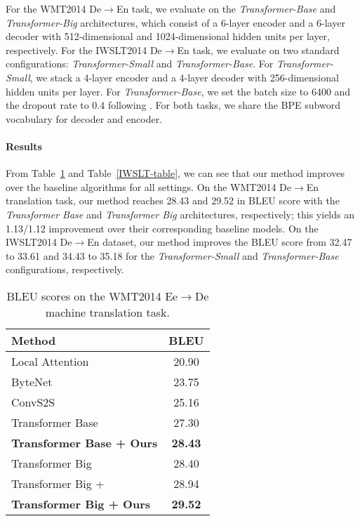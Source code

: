 \documentclass{article}
\begin{document}
For the WMT2014 De$\to$En task,
we evaluate on the \textit{Transformer-Base} and \textit{Transformer-Big} architectures,
which consist of a 6-layer encoder and a 6-layer decoder with 512-dimensional and 1024-dimensional hidden units per layer, respectively. 
For the IWSLT2014 De$\to$En task, 
we evaluate on two standard configurations: \textit{Transformer-Small} and \textit{Transformer-Base}.
For \textit{Transformer-Small}, we stack a 4-layer encoder and a 4-layer decoder with 256-dimensional hidden units per layer. For \textit{Transformer-Base}, we set the batch size to 6400 and the dropout rate to 0.4 following \citet{wang2018multiagent}. For both tasks, we share the BPE subword vocabulary for decoder and encoder.


\paragraph{Results}
From Table~\ref{WMT-table} and Table~\ref{IWSLT-table}, 
we can see that our method
improves over the baseline algorithms for all settings.  
On the WMT2014 De$\to$En translation task, 
our method reaches 28.43 and 29.52 in BLEU score 
with the \textit{Transformer Base} and \textit{Transformer Big} architectures,  respectively; 
this yields an 1.13/1.12 improvement over their corresponding baseline models. 
On the IWSLT2014 De$\to$En dataset,
our method improves the BLEU score from 32.47 to  33.61 and 34.43 to 35.18 for the  \textit{Transformer-Small} and \textit{Transformer-Base} configurations, respectively.




















\begin{table}[ht]
  	\begin{center}
  	\setlength\extrarowheight{1.5pt}
	\begin{tabular}{lc}
\toprule 
\bf  Method & \bf  BLEU \\
\hline
Local Attention~\cite{luong2015effective} &  20.90 \\
ByteNet~\cite{kalchbrenner2016neural} &  23.75 \\
ConvS2S~\cite{gehring2017convolutional} &  25.16 \\
\hline
Transformer Base ~\cite{vaswani2017attention}&  27.30 \\
\bf{Transformer Base + Ours} &  \bf {28.43} \\
\hline
Transformer Big ~\cite{vaswani2017attention}&  28.40 \\
Transformer Big + ~\cite{gao2018representation} &  28.94 \\
\bf{Transformer Big + Ours} &  \bf{29.52} \\
\bottomrule 
\end{tabular}
\end{center}
\caption{\label{WMT-table}  BLEU scores on the WMT2014 Ee$\to$De machine translation task. }
\end{table}
\end{document}
